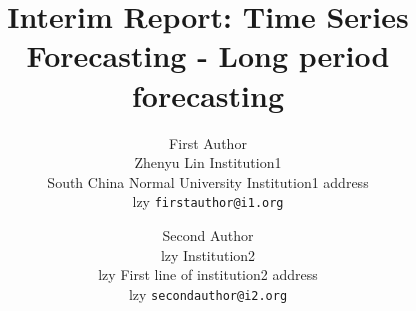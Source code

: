 \documentclass[10pt,twocolumn,letterpaper]{article}
\title{Interim Report: Time Series Forecasting - Long period forecasting}
\author{First Author\\Zhenyu Lin
Institution1\\South China Normal University
Institution1 address\\lzy
{\tt\small firstauthor@i1.org}
\and
Second Author\\lzy
Institution2\\lzy
First line of institution2 address\\lzy
{\tt\small secondauthor@i2.org}
}
\begin{document}
\maketitle
    



%



%
{
    \small
    
    
}

% 
\end{document}
